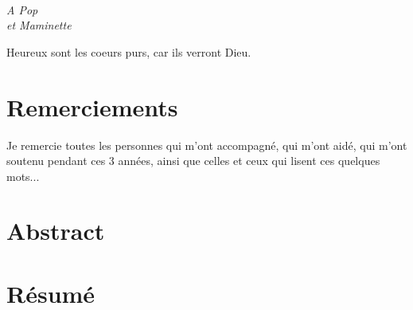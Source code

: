 \documentclass[a4paper]{book}
\begin{document}

\cleardoublepage\normalsize
\ 
\vfill
\begin{FlushRight}\itshape
A Pop\\
et Maminette

\vfill\normalshape
Heureux sont les coeurs purs, car ils verront Dieu. %


\end{FlushRight}

\newpage


\chapter*{Remerciements}
\pagestyle{plain}
Je remercie toutes les personnes qui m'ont accompagné, qui m'ont aidé, qui m'ont soutenu pendant ces 3 années, ainsi que celles et ceux qui lisent ces quelques mots...


\newpage

\chapter*{Abstract}
  \vspace*{0.5cm}
\begin{mdframed}[linecolor=white]
  \begin{mdframed}[linecolor=white]
  \abstractEN 
\end{mdframed} 
\end{mdframed}






\chapter*{Résumé}
\vspace*{0.5cm}
\begin{mdframed}[linecolor=white]
  \begin{mdframed}[linecolor=white]
\abstractFR
\end{mdframed} 
\end{mdframed}
\end{document}
